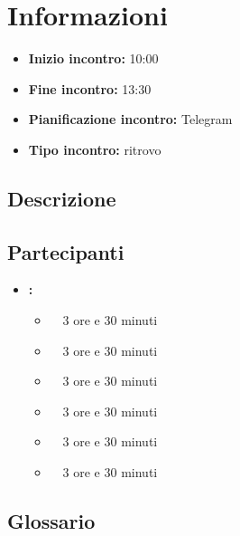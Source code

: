 \section{Informazioni}
\begin{itemize}
	\item \textbf{Inizio incontro:} 10:00
	\item \textbf{Fine incontro:} 13:30
	\item \textbf{Pianificazione incontro:} Telegram
	\item \textbf{Tipo incontro:} ritrovo
\end{itemize}

\subsection{Descrizione}
\DocDescription

\subsection{Partecipanti}

\begin{itemize}
	\item \textbf{\GroupName:}
	\begin{itemize}
		\item \tommaso \ \rightarrow\ 3 ore e 30 minuti
		\item \marco \ \rightarrow\ 3 ore e 30 minuti
		\item \riccardo \ \rightarrow\ 3 ore e 30 minuti
		\item \raul \ \rightarrow\ 3 ore e 30 minuti
		\item \martina \ \rightarrow\ 3 ore e 30 minuti
		\item \sebastiano \ \rightarrow\ 3 ore e 30 minuti
	\end{itemize}
\end{itemize}

\subsection{Glossario}
\GlossarioIntroduzione

\clearpage